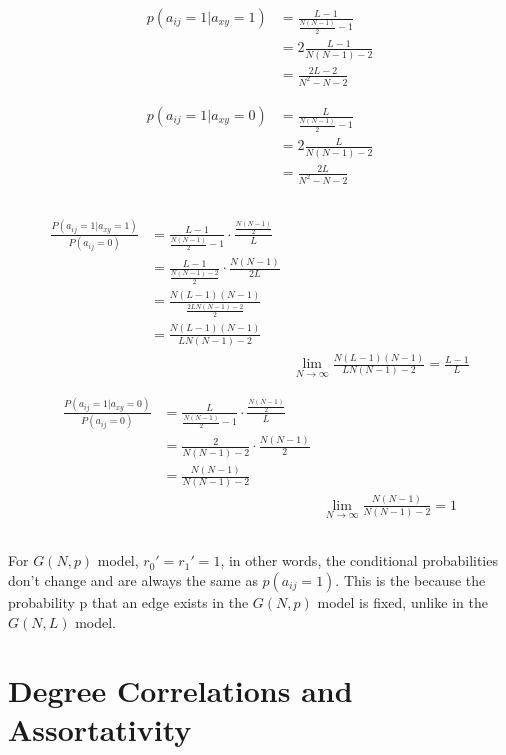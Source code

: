 \documentclass {article}
\begin{document}
\begin{align*}	
	p(a_{ij} = 1 | a_{xy} = 1) &= \frac{ L-1 }{ \frac{ N(N-1) }{ 2 } - 1 } \\
	&= 2 \frac{ L-1 }{ N(N-1) - 2 } \\
	&= \frac{ 2L-2 }{ N^2-N-2 }
\end{align*}

\begin{align*}	
	p(a_{ij} = 1 | a_{xy} = 0) &= \frac{ L }{ \frac{ N(N-1) }{ 2 } - 1 } \\
	&= 2 \frac{ L }{ N(N-1) - 2 } \\
	&= \frac{ 2L }{ N^2-N-2 }
\end{align*}

\subsection{}
\begin{align*}
	\frac{P \left( a_{ij} = 1 | a_{xy} = 1 \right)}{P \left( a_{ij}=0 \right)} &=\frac{L-1}{\frac{N(N-1)}{2}-1} \cdot \frac{\frac{N(N-1)}{2}}{L}\\
	&=\frac{L-1}{\frac{N(N-1)-2}{2}} \cdot \frac{N(N-1)}{2L}\\
	&= \frac{N(L-1)(N-1)}{\frac{2LN(N-1)-2}{2}}\\
	&= \frac{N(L-1)(N-1)}{LN(N-1)-2}\\
	&&\lim\limits_{N \to \infty}  \frac{N(L-1)(N-1)}{LN(N-1)-2} = \frac{L-1}{L}
\end{align*}

\begin{align*}
	\frac{P \left( a_{ij} = 1 | a_{xy} = 0 \right)}{P \left( a_{ij}=0 \right)} &=\frac{L}{\frac{N(N-1)}{2}-1} \cdot \frac{\frac{N(N-1)}{2}}{L}\\
	&= \frac{2}{N(N-1)-2} \cdot \frac{N(N-1)}{2}\\
	&= \frac{N(N-1)}{N(N-1)-2}\\
	&&\lim\limits_{N \to \infty} \frac{N(N-1)}{N(N-1)-2} = 1
\end{align*}

\subsection{}
For $G(N,p)$ model, $r_0' = r_1' = 1$, in other words, the conditional probabilities don't change and are always the same as $p(a_{ij} = 1)$. This is the because the probability p that an edge exists in the $G(N,p)$ model is fixed, unlike in the $G(N,L)$ model.

\subsection{}
\newpage




\section{Degree Correlations and Assortativity}
\end{document}
